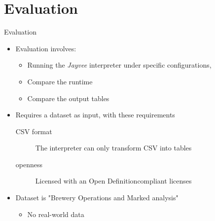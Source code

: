 \section{Evaluation}
\begin{frame}[t]{Evaluation}
	\begin{itemize}
		\item Evaluation involves:
		      \begin{itemize}
			      \item Running the \emph{Jayvee} interpreter under specific configurations,
			      \item Compare the runtime
			      \item Compare the output tables
		      \end{itemize}
		\item Requires a dataset as input, with these requirements
		      \begin{description}
			      \item[CSV format] The interpreter can only transform CSV into tables
			      \item[openness] Licensed with an Open Definition\footnotemark[1] compliant licenses\footnotemark[2]
		      \end{description}
		\item Dataset is "Brewery Operations and Marked analysis"\footnotemark[3]
		      \begin{itemize}
			      \item No real-world data
		      \end{itemize}
	\end{itemize}
\end{frame}
